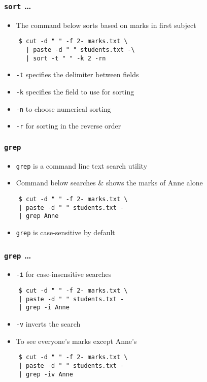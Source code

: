 \documentclass[12pt,compress]{beamer}
\begin{document}
\begin{frame}[fragile]
  \frametitle{\texttt{sort} \ldots}
  \begin{itemize}
  \item The command below sorts based on marks in first subject
  \end{itemize}
  \begin{lstlisting}
    $ cut -d " " -f 2- marks.txt \
      | paste -d " " students.txt -\
      | sort -t " " -k 2 -rn
  \end{lstlisting} %
  \begin{itemize}
  \item \texttt{-t} specifies the delimiter between fields
  \item \texttt{-k} specifies the field to use for sorting
  \item \texttt{-n} to choose numerical sorting
  \item \texttt{-r} for sorting in the reverse order
  \end{itemize}
\end{frame}

\begin{frame}[fragile]
  \frametitle{\texttt{grep}}
  \begin{itemize}
  \item \texttt{grep} is a command line text search utility
  \item Command below searches \& shows the marks of Anne alone 
  \end{itemize}
  \begin{lstlisting}
    $ cut -d " " -f 2- marks.txt \
    | paste -d " " students.txt - 
    | grep Anne
  \end{lstlisting} %
  \begin{itemize}
  \item \texttt{grep} is case-sensitive by default
  \end{itemize}
\end{frame}

\begin{frame}[fragile]
  \frametitle{\texttt{grep} \ldots}
  \begin{itemize}
  \item \texttt{-i} for case-insensitive searches
  \end{itemize}
  \begin{lstlisting}
    $ cut -d " " -f 2- marks.txt \
    | paste -d " " students.txt - 
    | grep -i Anne
  \end{lstlisting} %
  \begin{itemize}
  \item \texttt{-v} inverts the search
  \item To see everyone's marks except Anne's
  \end{itemize}
  \begin{lstlisting}
    $ cut -d " " -f 2- marks.txt \
    | paste -d " " students.txt - 
    | grep -iv Anne
  \end{lstlisting} %
\end{frame}
\end{document}
